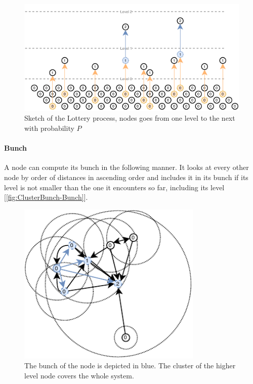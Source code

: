 \documentclass[a4paper,11pt,oneside]{report}
\begin{document}
\begin{figure}[!h] 
\centering
\includegraphics[width=400pt]{figures/Lottery-Standard}
\caption{Sketch of the Lottery process, nodes goes from one level to the next
    with probability $P$} \label{fig:ClusterBunch-Bunch}
\end{figure}

\paragraph{Bunch} A node can compute its bunch in the following manner. It
looks at every other node by order of distances in ascending order and
includes it in its bunch if its level is not smaller than the one it encounters
so far, including its level [\autoref{fig:ClusterBunch-Bunch}]. 

\begin{figure}[!h] 
\centering
\includegraphics[width=250pt]{figures/ClusterBunch-Bunch}
\caption{ The bunch of the node is depicted in blue. The cluster of the higher
    level node covers the whole system. } \label{fig:ClusterBunch-Bunch}
\end{figure}
\end{document}
